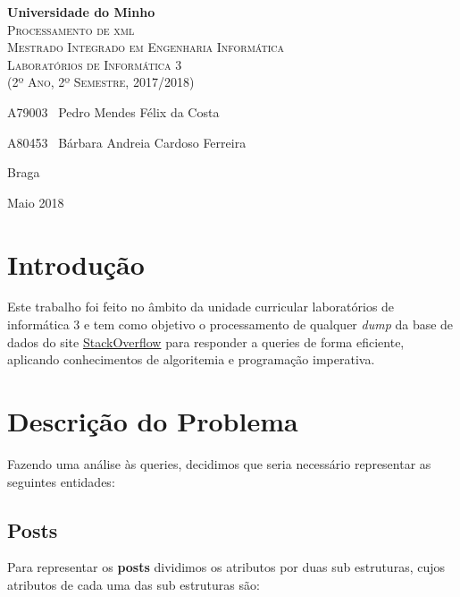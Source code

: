 \documentclass[10pt,a4paper]{article}
\begin{document}
\begin{titlepage}
    \center
    {\huge {\bf Universidade do Minho}}\\[0.4cm]
    \vspace{3.0cm}
    \textsc{\huge{Processamento de xml}}\\[0.5cm] %
    \vspace{3.0cm}
    \textsc{\huge{Mestrado Integrado em Engenharia Informática}}\\[0.5cm]
    \vspace{2.0cm}
    \textsc{Laboratórios de Informática 3}\\[0.5cm]
    \textsc{(2º Ano, 2º Semestre, 2017/2018)}\\[0.5cm]
    \vspace{1.5cm}
    \begin{flushleft}
        A79003 \,\,\,Pedro Mendes Félix da Costa
        \vspace{0.2cm}

        A80453 \,\,\,Bárbara Andreia Cardoso Ferreira
    \end{flushleft}
        \vspace{1cm}
    \begin{flushright}
        Braga

        Maio 2018
    \end{flushright}

\end{titlepage}

\tableofcontents
\clearpage

\section{Introdução}
    Este trabalho foi feito no âmbito da unidade curricular laboratórios de
    informática 3 e tem como objetivo o processamento de qualquer \textit{dump}
    da base de dados do site \href{www.stackoverflow.com}{StackOverflow} para
    responder a queries de forma eficiente, aplicando conhecimentos de
    algoritemia e programação imperativa.

\section{Descrição do Problema}
    Fazendo uma análise às queries, decidimos que seria necessário representar
    as seguintes entidades:

    \subsection{Posts}
    Para representar os \textbf{posts} dividimos os atributos por duas
     sub estruturas, cujos atributos de cada uma das sub estruturas são:
\end{document}
